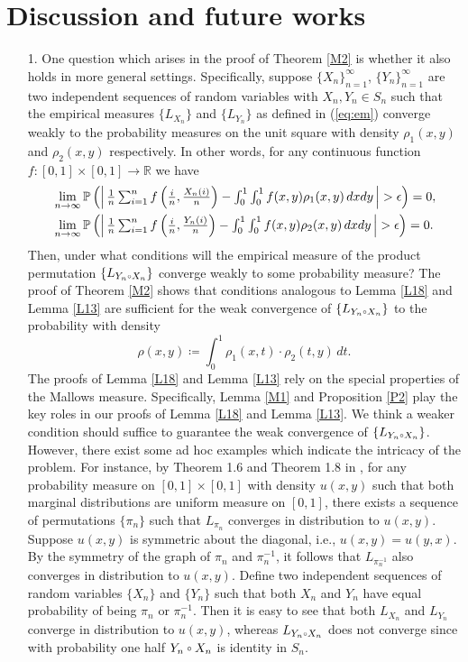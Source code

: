 \section{Discussion and future works}
\begin{itemize}
\item[1.]
One question which arises in the proof of Theorem \ref{M2} is whether it also holds in more general settings. Specifically, suppose $\{X_n\}_{n = 1}^{\infty}$, $\{Y_n\}_{n = 1}^{\infty}$ are two independent sequences of random variables  with $X_n, Y_n \in S_n$ such that the empirical measures $\{L_{X_n}\}$ and $\{L_{Y_n}\}$ as defined in (\ref{eq:em}) converge weakly to the probability measures on the unit square with density $\rho_1(x, y)$ and $\rho_2(x, y)$ respectively. In other words, for any continuous function $f: [0,1]\times[0,1] \rightarrow \mathbb{R}$ we have
\begin{align*}
&\lim_{n \to \infty}\textstyle\mathbb{P}\left(\left|\, \frac{1}{n}\sum_{i=1}^{n}f\left(\frac{i}{n}, \frac{X_n(i)}{n}\right) -
  \int_0^1\int_0^1 f(x, y) \rho_1(x, y)\,dxdy\, \right| > \epsilon \right) = 0,\\
&\lim_{n \to \infty}\textstyle\mathbb{P}\left(\left|\, \frac{1}{n}\sum_{i=1}^{n}f\left(\frac{i}{n}, \frac{Y_n(i)}{n}\right) -
  \int_0^1\int_0^1 f(x, y) \rho_2(x, y)\,dxdy\, \right| > \epsilon \right) = 0.
\end{align*}
Then, under what conditions will the empirical measure of the product permutation $\{L_{Y_n \ccirc X_n}\}$ converge weakly to some probability measure? The proof of Theorem \ref{M2} shows that conditions analogous to Lemma \ref{L18} and Lemma \ref{L13} are sufficient for the weak convergence of $\{L_{Y_n \ccirc X_n}\}$ to the probability with density $$
\rho(x, y) \coloneqq \textstyle\int_0^1 \rho_1(x, t)\cdot \rho_2(t, y)\,dt.
$$
The proofs of Lemma \ref{L18} and Lemma \ref{L13} rely on the special properties of the Mallows measure. Specifically, Lemma \ref{M1} and Proposition \ref{P2} play the key roles in our proofs of Lemma \ref{L18} and Lemma \ref{L13}. We think a weaker condition should suffice to guarantee the weak convergence of  $\{L_{Y_n \ccirc X_n}\}$. However, there exist some ad hoc examples which indicate the intricacy of the problem. For instance, by Theorem 1.6 and Theorem 1.8 in \cite{hoppen}, for any probability measure on $[0, 1]\times[0, 1]$ with density $u(x, y)$ such that both marginal distributions are uniform measure on $[0, 1]$, there exists a sequence of permutations $\{\pi_n\}$ such that $L_{\pi_n}$ converges in distribution to $u(x, y)$. Suppose $u(x, y)$ is symmetric about the diagonal, i.e., $u(x, y) = u(y, x)$. By the symmetry of the graph of $\pi_n$ and $\pi_n^{-1}$, it follows that $L_{\pi_n^{-1}}$ also converges in distribution to $u(x, y)$. Define two independent sequences of random variables $\{X_n\}$ and $\{Y_n\}$ such that both $X_n$ and $Y_n$ have equal probability of being $\pi_n$ or $\pi_n^{-1}$. Then it is easy to see that both $L_{X_n}$ and $L_{Y_n}$ converge in distribution to $u(x, y)$, whereas $L_{Y_n \ccirc X_n}$ does not converge since with probability one half $Y_n \ccirc X_n$ is identity in $S_n$.


\end{itemize}
